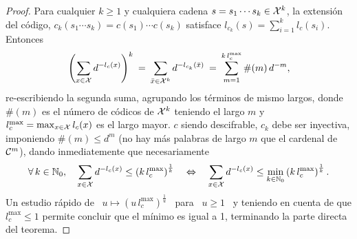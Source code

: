 \begin{proof}
  Para cualquier $k \ge 1$ y cualquiera  cadena $s = s_1 \cdots s_k \in \mathcal{X}^k$, la
  extensi\'on  del  c\'odigo,  $c_k(s_1  \cdots  s_k) =  c(s_1)  \cdots  c(s_k)$
  satisface $l_{c_k}(s) = \sum_{i=1}^k l_c(s_i)$. Entonces
  \[
  \left(  \sum_{x  \in \mathcal{X}}  d^{-l_c(x)}  \right)^k \:  =  \:  \sum_{\bar{x} \in  \mathcal{X}^k}
  d^{-l_{c_k}(\bar{x})} \: = \: \sum_{m=1}^{k \, l_c^{\max}} \#(m) \, d^{-m},
  \]
  re-escribiendo  la segunda  suma, agrupando  los t\'erminos  de  mismo largos,
  donde $\#(m)$  es el n\'umero de c\'odicos  de $\mathcal{X}^k$ teniendo el  largo $m$ y
  $l_c^{\max}  =  \max_{x  \in  \mathcal{X}}  l_c(x)$  es el  largo  mayor.   $c$  siendo
  descifrable,  $c_k$ debe  ser inyectiva,  imponiendo $\#(m)  \le d^m$  (no hay
  m\'as palabras de  largo $m$ que el cardenal  de $\mathcal{C}^m$), dando inmediatemente
  que necesariamente
  \[
  \forall \,  k \in \mathbb{N}_0, \quad \sum_{x  \in \mathcal{X}} d^{-l_c(x)} \le  \left( k \,
    l_c^{\max}  \right)^{\frac1k} \quad  \Leftrightarrow \quad  \sum_{x  \in \mathcal{X}}
  d^{-l_c(x)} \le \min_{k \in \mathbb{N}_0} \left( k \, l_c^{\max} \right)^{\frac1k}.
  \]
  Un estudio r\'apido de \  $u \mapsto \left( u \, l_c^{\max} \right)^{\frac1u}$
  \ para \  $u \ge 1$ \ y  teniendo en cuenta de que $l_c^{\max}  \le 1$ permite
  concluir  que el  m\'inimo  es igual  a  1, terminando  la  parte directa  del
  teorema.


\end{proof}

